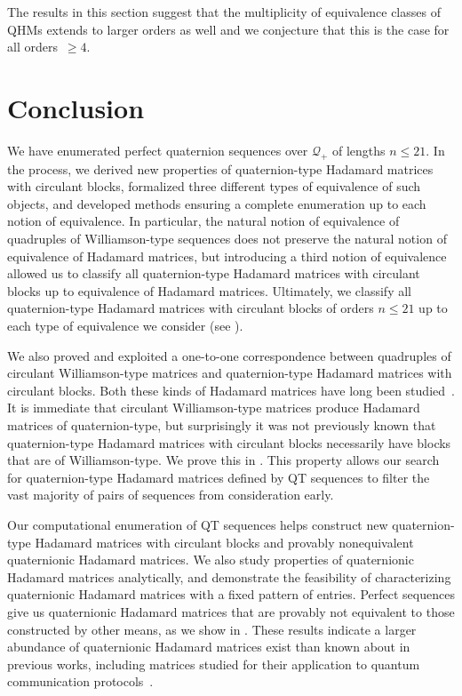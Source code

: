 \documentclass[12pt]{article}
\numberwithin{equation}{section}
\newcommand{\Q}{\mathcal{Q}}
\begin{document}
The results in this section suggest that the multiplicity of equivalence classes of QHMs extends to larger orders as well and we conjecture that this is the case for all orders~$\ge 4$.

\section{Conclusion}

We have enumerated perfect quaternion sequences over $\Q_+$ of lengths $n\leq21$.
In the process, we derived new properties of quaternion-type Hadamard matrices with circulant blocks,
formalized three different types of equivalence of such objects, and developed methods ensuring a complete enumeration
up to each notion of equivalence.  In particular, the natural notion of equivalence of quadruples of Williamson-type sequences does not preserve the natural
notion of equivalence of Hadamard matrices, but introducing a third notion of equivalence allowed us to classify all
quaternion-type Hadamard matrices with circulant blocks up to equivalence of Hadamard matrices.
Ultimately, we classify all quaternion-type Hadamard matrices with circulant blocks of orders $n\leq21$ up to each
type of equivalence we consider (see ).

We also proved and exploited a one-to-one correspondence between quadruples of circulant Williamson-type matrices and quaternion-type Hadamard matrices with circulant blocks.
Both these kinds of Hadamard matrices have long been studied~\cite{Golomb1963,Wallis1973}.
It is immediate that
circulant Williamson-type matrices produce Hadamard matrices of quaternion-type, but surprisingly
it was not previously known that quaternion-type Hadamard matrices with circulant blocks
necessarily have blocks that are of Williamson-type.
We prove this in .  This property
allows our search for quaternion-type Hadamard matrices defined by QT sequences
to filter the vast majority of pairs of sequences from consideration early.

Our computational enumeration of QT sequences helps construct new quaternion-type Hadamard matrices with circulant blocks and provably nonequivalent quaternionic Hadamard matrices.
We also study properties of quaternionic Hadamard matrices analytically, and demonstrate the feasibility of characterizing quaternionic Hadamard matrices with a fixed pattern of entries.
Perfect sequences give us quaternionic Hadamard matrices that are provably not equivalent to those constructed by other means, as we show in .
These results indicate a larger abundance of quaternionic Hadamard matrices exist than known about in previous works,
including matrices studied for their application to quantum communication protocols~\cite{FKN23-mum-superdense-coding}.
\end{document}
